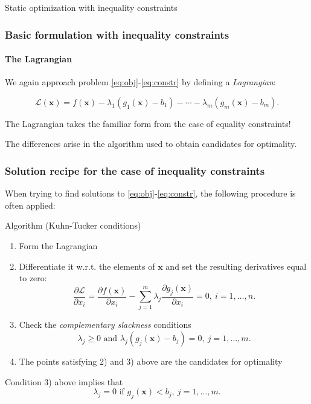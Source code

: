 \documentclass[10pt]{beamer}
\theoremstyle{definition}
\begin{document}
\begin{section}{Static optimization with inequality constraints}
\begin{frame}[fragile]
\frametitle{Basic formulation with inequality constraints}
\framesubtitle{The Lagrangian}
We again approach problem \eqref{eq:obj}-\eqref{eq:constr} by defining a \emph{Lagrangian}:

\[ \mathcal{L}(\mathbf{x}) = f(\mathbf{x}) - \lambda_1 (g_1(\mathbf{x})-b_1) - \cdots - \lambda_m (g_m(\mathbf{x})-b_m). \]\bigskip

The Lagrangian takes the familiar form from the case of equality constraints! \bigskip

The differences arise in the algorithm used to obtain candidates for optimality.
\end{frame}

\begin{frame}[fragile]
\frametitle{Solution recipe for the case of inequality constraints}
When trying to find solutions to \eqref{eq:obj}-\eqref{eq:constr}, the following procedure is often applied:

\begin{block}{Algorithm (Kuhn-Tucker conditions)}
\begin{enumerate}
\item Form the Lagrangian
\item Differentiate it w.r.t. the elements of $ \mathbf{x} $ and set the resulting derivatives equal to zero:
\begin{equation}
\dfrac{\partial \mathcal{L}}{\partial x_i} = \dfrac{\partial f(\mathbf{x})}{\partial x_i} - \sum_{j=1}^{m}\lambda_j \dfrac{\partial g_j(\mathbf{x})}{\partial x_i} = 0,~i=1,\ldots,n.
\label{eq:dLdX}
\end{equation}
\item Check the \emph{complementary slackness} conditions \begin{equation}
\lambda_j \geq 0 \text{ and } \lambda_j (g_j(\mathbf{x})-b_j) = 0,~j=1,\ldots,m.
\label{eq:ComplSlack}
\end{equation}
\item The points satisfying 2) and 3) above are the candidates for optimality
\end{enumerate}
\end{block}

Condition 3) above implies that \[ \lambda_j = 0 \text{ if } g_j(\mathbf{x})<b_j,~j=1,\ldots,m. \]
\end{frame}


\end{section}
\end{document}
